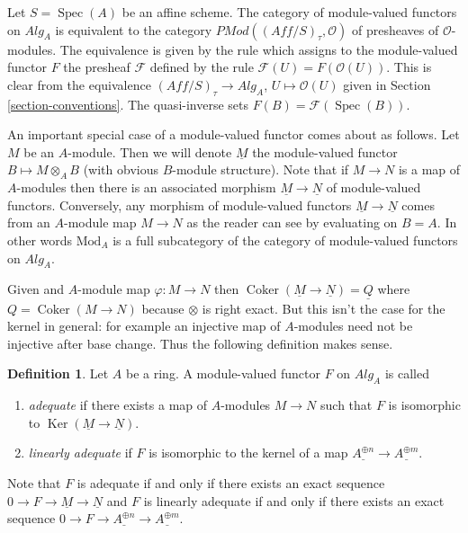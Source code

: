 \documentclass{stacks-project}
\theoremstyle{plain}
\theoremstyle{definition}
\newtheorem{definition}[subsection]{Definition}
\theoremstyle{remark}
\numberwithin{equation}{subsection}
\def\Spec{\mathop{\mathrm{Spec}}}
\def\Ker{\mathop{\mathrm{Ker}}}
\def\Coker{\mathop{\mathrm{Coker}}}
\begin{document}
\noindent
Let $S = \Spec(A)$ be an affine scheme.
The category of module-valued functors on $\textit{Alg}_A$ is
equivalent to the category
$\textit{PMod}((\textit{Aff}/S)_\tau, \mathcal{O})$
of presheaves of $\mathcal{O}$-modules. The equivalence is given
by the rule which assigns to the module-valued functor $F$ the
presheaf $\mathcal{F}$ defined by the rule
$\mathcal{F}(U) = F(\mathcal{O}(U))$.
This is clear from the equivalence
$(\textit{Aff}/S)_\tau \to \textit{Alg}_A$, $U \mapsto \mathcal{O}(U)$
given in Section \ref{section-conventions}.
The quasi-inverse sets $F(B) = \mathcal{F}(\Spec(B))$.

\medskip\noindent
An important special case of a module-valued functor comes about as follows.
Let $M$ be an $A$-module. Then we will denote $\underline{M}$ the
module-valued functor $B \mapsto M \otimes_A B$ (with obvious $B$-module
structure). Note that if $M \to N$ is a map of $A$-modules then there is an
associated morphism $\underline{M} \to \underline{N}$ of module-valued
functors. Conversely, any morphism of module-valued functors
$\underline{M} \to \underline{N}$ comes from an $A$-module map $M \to N$
as the reader can see by evaluating on $B = A$. In other words
$\text{Mod}_A$ is a full
subcategory of the category of module-valued functors on $\textit{Alg}_A$.

\medskip\noindent
Given and $A$-module map $\varphi : M \to N$ then
$\Coker(\underline{M} \to \underline{N}) =
\underline{Q}$ where $Q = \Coker(M \to N)$ because $\otimes$
is right exact. But this isn't the case
for the kernel in general: for example an injective map of
$A$-modules need not be injective after base change. Thus the following
definition makes sense.

\begin{definition}
\label{definition-adequate-functor}
Let $A$ be a ring. A module-valued functor $F$ on $\textit{Alg}_A$ is
called
\begin{enumerate}
\item {\it adequate} if there exists a
map of $A$-modules $M \to N$ such that $F$ is isomorphic to
$\Ker(\underline{M} \to \underline{N})$.
\item {\it linearly adequate} if $F$ is isomorphic to the
kernel of a map $\underline{A^{\oplus n}} \to \underline{A^{\oplus m}}$.
\end{enumerate}
\end{definition}

\noindent
Note that $F$ is adequate if and only if there exists an
exact sequence $0 \to F \to \underline{M} \to \underline{N}$ and
$F$ is linearly adequate if and only if there exists an exact sequence
$0 \to F \to \underline{A^{\oplus n}} \to \underline{A^{\oplus m}}$.
\end{document}
